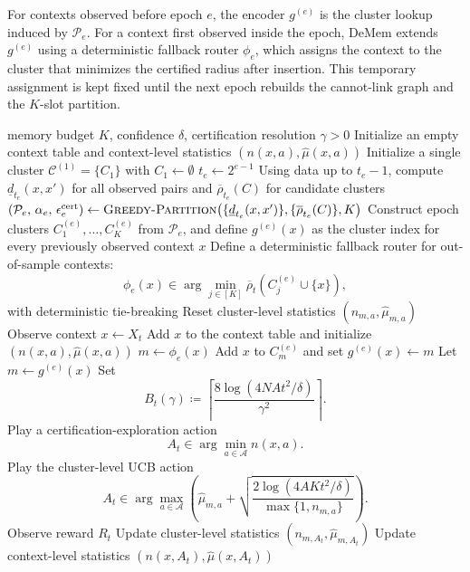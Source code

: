 \documentclass{article}
\theoremstyle{plain}
\theoremstyle{definition}
\theoremstyle{remark}
\newcommand{\cA}{\mathcal{A}}
\newcommand{\eps}{\epsilon}
\newcommand{\cC}{\mathcal{C}}
\begin{document}
\begin{algorithm}[p]
\caption{DeMem: Decision-aware Memory with Certified Splits}
\label{alg:DeMem}
For contexts observed before epoch \(e\), the encoder \(g^{(e)}\) is the
cluster lookup induced by \(\mathcal P_e\). For a context first observed
inside the epoch, DeMem extends \(g^{(e)}\) using a deterministic
fallback router \(\phi_e\), which assigns the context to the cluster that
minimizes the certified radius after insertion. This temporary assignment
is kept fixed until the next epoch rebuilds the cannot-link graph and the
\(K\)-slot partition.
\begin{algorithmic}[1]
\Require memory budget \(K\), confidence \(\delta\), certification resolution \(\gamma>0\)
\State Initialize an empty context table and context-level statistics
  \((n(x,a),\hat\mu(x,a))\)
\State Initialize a single cluster \(\cC^{(1)}=\{C_1\}\) with
  \(C_1\gets\emptyset\)
    \State \(t_e\gets 2^{e-1}\)
    \State Using data up to \(t_e-1\), compute
      \(\underline d_{t_e}(x,x')\) for all observed pairs and
      \(\overline\rho_{t_e}(C)\) for candidate clusters
    \State \((\mathcal P_e,\,\alpha_e,\,\eps^{\mathrm{cert}}_e)\gets
      \textsc{Greedy-Partition}\bigl(
        \{\underline d_{t_e}(x,x')\},\{\overline\rho_{t_e}(C)\},K
      \bigr)\)
    \State Construct epoch clusters \(C^{(e)}_1,\dots,C^{(e)}_K\) from
      \(\mathcal P_e\), and define \(g^{(e)}(x)\) as the cluster index for
      every previously observed context \(x\)
    \State Define a deterministic fallback router for out-of-sample contexts:
    \[
    \phi_e(x)
    \in
    \arg\min_{j\in[K]}
    \overline\rho_t\!\left(C^{(e)}_j\cup\{x\}\right),
    \]
    with deterministic tie-breaking
    \State Reset cluster-level statistics \((n_{m,a},\hat\mu_{m,a})\)
        \State Observe context \(x\gets X_t\)
            \State Add \(x\) to the context table and initialize
              \((n(x,a),\hat\mu(x,a))\)
            \State \(m\gets \phi_e(x)\)
            \State Add \(x\) to \(C^{(e)}_m\) and set \(g^{(e)}(x)\gets m\)
        \EndIf
        \State Let \(m\gets g^{(e)}(x)\)
        \State Set
        \[
        B_t(\gamma)
        \coloneqq
        \left\lceil
        \frac{8\log(4NAt^2/\delta)}{\gamma^2}
        \right\rceil .
        \]
        \If{there exists \(a\in\cA\) with \(n(x,a)<B_t(\gamma)\)}
            \State Play a certification-exploration action
            \[
            A_t\in\arg\min_{a\in\cA} n(x,a).
            \]
        \Else
            \State Play the cluster-level UCB action
            \[
            A_t\in\arg\max_{a\in\cA}
            \left(
            \hat\mu_{m,a}
            +
            \sqrt{
            \frac{2\log(4AKt^2/\delta)}
            {\max\{1,n_{m,a}\}}
            }
            \right).
            \]
        \EndIf
        \State Observe reward \(R_t\)
        \State Update cluster-level statistics
          \((n_{m,A_t},\hat\mu_{m,A_t})\)
        \State Update context-level statistics
          \((n(x,A_t),\hat\mu(x,A_t))\)
    \EndFor
\EndFor
\end{algorithmic}
\end{algorithm}
\end{document}
